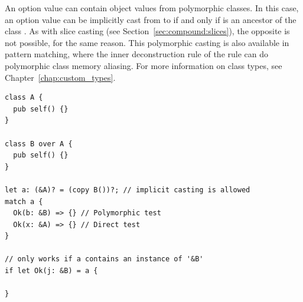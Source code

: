 An option value can contain object values from polymorphic classes. In this
case, an option value can be implicitly cast from  to  if
and only if  is an ancestor of the class . As with slice
casting (see Section~\ref{sec:compound:slices}), the opposite is not possible, for the
same reason. This
polymorphic casting is also available in pattern matching, where the inner
deconstruction rule of the  rule can do polymorphic class memory
aliasing. For more information on class types, see
Chapter~\ref{chap:custom_types}.

\begin{lstlisting}[style=coloredverbatim]
class A {
  pub self() {}
}

class B over A {
  pub self() {}
}

let a: (&A)? = (copy B())?; // implicit casting is allowed
match a {
  Ok(b: &B) => {} // Polymorphic test
  Ok(x: &A) => {} // Direct test
}

// only works if a contains an instance of '&B'
if let Ok(j: &B) = a {

}
\end{lstlisting}
